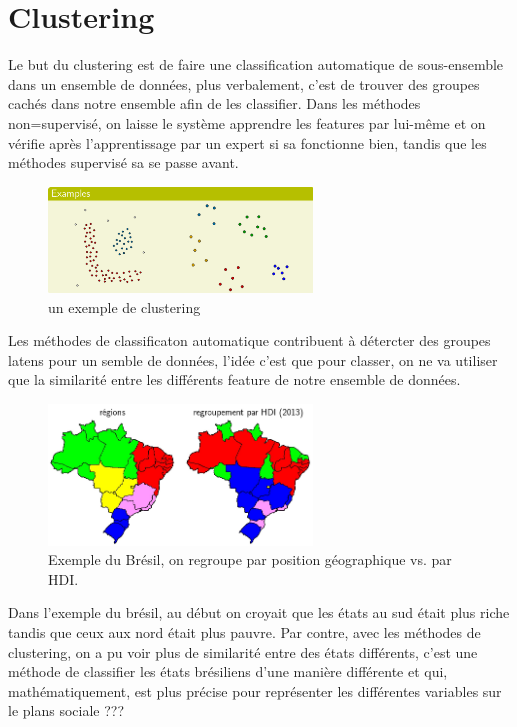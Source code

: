 \documentclass[oneside]{book}
\begin{document}
\section{Clustering}
Le but du clustering est de faire une classification automatique de sous-ensemble dans un ensemble de données, plus verbalement, c'est de trouver des groupes cachés dans notre ensemble afin de les classifier. Dans les méthodes non=supervisé, on laisse le système apprendre les features par lui-même et on vérifie après l'apprentissage par un expert si sa fonctionne bien, tandis que les méthodes supervisé sa se passe avant.\\

\begin{figure}[!ht]
\centering
\includegraphics[width = 7cm]{cluster.png}
\caption{un exemple de clustering}
\label{fig:cluster}
\end{figure}

Les méthodes de classificaton automatique contribuent à détercter des groupes latens pour un semble de données, l'idée c'est que pour classer, on ne va utiliser que la similarité entre les différents feature de notre ensemble de données. \\

\begin{figure}[!ht]
\centering
\includegraphics[width = 7cm]{bresil.png}
\caption{Exemple du Brésil, on regroupe par position géographique vs. par HDI.}
\label{fig:bresil}
\end{figure}

Dans l'exemple du brésil, au début on croyait que les états au sud était plus riche tandis que ceux aux nord était plus pauvre. Par contre, avec les méthodes de clustering, on a pu voir plus de similarité entre des états différents, c'est une méthode de classifier les états brésiliens d'une manière différente et qui, mathématiquement, est plus précise pour représenter les différentes variables sur le plans sociale ???\\
\end{document}
